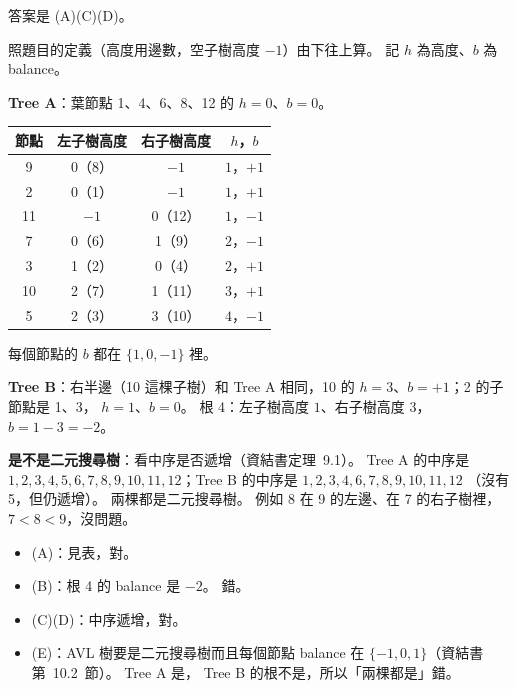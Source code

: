 \begin{pastsoln}
答案是 (A)(C)(D)。

照題目的定義（高度用邊數，空子樹高度 $-1$）由下往上算。 記 $h$ 為高度、$b$ 為 balance。

\textbf{Tree A}：葉節點 1、4、6、8、12 的 $h = 0$、$b = 0$。
\begin{center}
\small
\begin{tabular}{cccc}
\toprule
節點 & 左子樹高度 & 右子樹高度 & $h$，$b$ \\
\midrule
9 & 0（8） & $-1$ & $1$，$+1$ \\
2 & 0（1） & $-1$ & $1$，$+1$ \\
11 & $-1$ & 0（12） & $1$，$-1$ \\
7 & 0（6） & 1（9） & $2$，$-1$ \\
3 & 1（2） & 0（4） & $2$，$+1$ \\
10 & 2（7） & 1（11） & $3$，$+1$ \\
5 & 2（3） & 3（10） & $4$，$-1$ \\
\bottomrule
\end{tabular}
\end{center}
每個節點的 $b$ 都在 $\{1, 0, -1\}$ 裡。

\textbf{Tree B}：右半邊（10 這棵子樹）和 Tree A 相同，10 的 $h = 3$、$b = +1$；2 的子節點是 1、3，
$h = 1$、$b = 0$。 根 4：左子樹高度 $1$、右子樹高度 $3$，$b = 1 - 3 = -2$。

\textbf{是不是二元搜尋樹}：看中序是否遞增（資結書定理~9.1）。 Tree A 的中序是
$1, 2, 3, 4, 5, 6, 7, 8, 9, 10, 11, 12$；Tree B 的中序是 $1, 2, 3, 4, 6, 7, 8, 9, 10, 11, 12$
（沒有 5，但仍遞增）。 兩棵都是二元搜尋樹。 例如 8 在 9 的左邊、在 7 的右子樹裡，$7 < 8 < 9$，沒問題。
\begin{itemize}
\item (A)：見表，對。
\item (B)：根 4 的 balance 是 $-2$。 錯。
\item (C)(D)：中序遞增，對。
\item (E)：AVL 樹要是二元搜尋樹而且每個節點 balance 在 $\{-1, 0, 1\}$（資結書第~10.2~節）。 Tree A 是，
Tree B 的根不是，所以「兩棵都是」錯。
\end{itemize}
\end{pastsoln}
